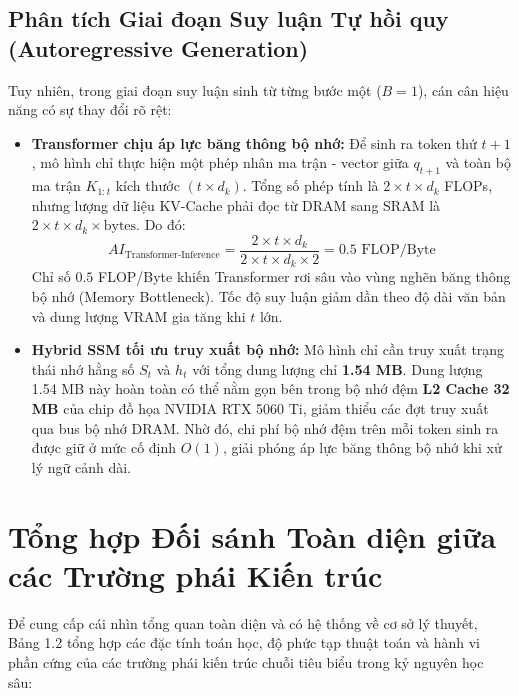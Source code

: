 \documentclass{uetgraduation}
\begin{document}
\subsection{Phân tích Giai đoạn Suy luận Tự hồi quy (Autoregressive Generation)}
Tuy nhiên, trong giai đoạn suy luận sinh từ từng bước một ($B=1$), cán cân hiệu năng có sự thay đổi rõ rệt:
\begin{itemize}
    \item \textbf{Transformer chịu áp lực băng thông bộ nhớ:} Để sinh ra token thứ $t+1$, mô hình chỉ thực hiện một phép nhân ma trận - vector giữa $q_{t+1}$ và toàn bộ ma trận $K_{1:t}$ kích thước $(t \times d_k)$. Tổng số phép tính là $2 \times t \times d_k$ FLOPs, nhưng lượng dữ liệu KV-Cache phải đọc từ DRAM sang SRAM là $2 \times t \times d_k \times \text{bytes}$. Do đó:
    \begin{equation}
    AI_{\text{Transformer-Inference}} = \frac{2 \times t \times d_k}{2 \times t \times d_k \times 2} = 0.5 \text{ FLOP/Byte}
    \end{equation}
    Chỉ số $0.5$ FLOP/Byte khiến Transformer rơi sâu vào vùng nghẽn băng thông bộ nhớ (Memory Bottleneck). Tốc độ suy luận giảm dần theo độ dài văn bản và dung lượng VRAM gia tăng khi $t$ lớn.
    \item \textbf{Hybrid SSM tối ưu truy xuất bộ nhớ:} Mô hình chỉ cần truy xuất trạng thái nhớ hằng số $S_t$ và $h_t$ với tổng dung lượng chỉ \textbf{1.54 MB}. Dung lượng 1.54 MB này hoàn toàn có thể nằm gọn bên trong bộ nhớ đệm \textbf{L2 Cache 32 MB} của chip đồ họa NVIDIA RTX 5060 Ti, giảm thiểu các đợt truy xuất qua bus bộ nhớ DRAM. Nhờ đó, chi phí bộ nhớ đệm trên mỗi token sinh ra được giữ ở mức cố định $O(1)$, giải phóng áp lực băng thông bộ nhớ khi xử lý ngữ cảnh dài.
\end{itemize}

\section{Tổng hợp Đối sánh Toàn diện giữa các Trường phái Kiến trúc}
Để cung cấp cái nhìn tổng quan toàn diện và có hệ thống về cơ sở lý thuyết, Bảng 1.2 tổng hợp các đặc tính toán học, độ phức tạp thuật toán và hành vi phần cứng của các trường phái kiến trúc chuỗi tiêu biểu trong kỷ nguyên học sâu:
\end{document}
